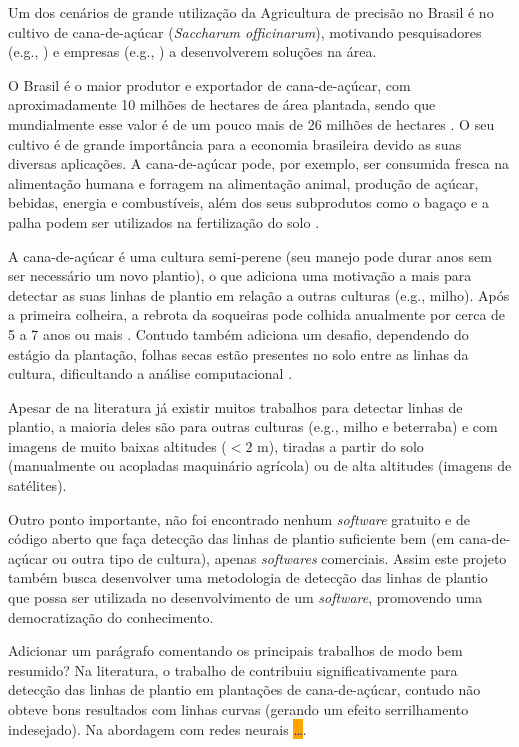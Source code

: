 \documentclass[12pt, a4paper, english, brazil]{article}
\newcommand{\textRed}[1]{{{\color{red} #1}}}
\newcommand{\dotsBlue}{\colorbox{orange}{\textcolor{blue}{\dots}}}
\begin{document}
Um dos cenários de grande utilização da Agricultura de precisão no Brasil é no cultivo de cana-de-açúcar (\textit{Saccharum officinarum}), motivando pesquisadores (e.g., ) e empresas (e.g., ) a desenvolverem soluções na área.

O Brasil é o maior produtor e exportador de cana-de-açúcar, com aproximadamente 10 milhões de hectares de área plantada, sendo que mundialmente esse valor é de um pouco mais de 26 milhões de hectares \cite{Ritchie_2020, IBGE_2021, FAOSTAT_2021}. O seu cultivo é de grande importância para a economia brasileira devido as suas diversas aplicações. A cana-de-açúcar pode, por exemplo, ser consumida fresca na alimentação humana e forragem na alimentação animal, produção de açúcar, bebidas, energia e combustíveis, além dos seus subprodutos como o bagaço e a palha podem ser utilizados na fertilização do solo \cite{Oliveira_2018}.

A cana-de-açúcar é uma cultura semi-perene (seu manejo pode durar anos sem ser necessário um novo plantio), o que adiciona uma motivação a mais para detectar as suas linhas de plantio em relação a outras culturas (e.g., milho). Após a primeira colheira, a rebrota da soqueiras pode colhida anualmente por cerca de 5 a 7 anos ou mais \cite{Rudorff_2010}. Contudo também adiciona um desafio, dependendo do estágio da plantação, folhas secas estão presentes no solo entre as linhas da cultura, dificultando a análise computacional \cite{Silva_2020}.

Apesar de na literatura já existir muitos trabalhos para detectar linhas de plantio, a maioria deles são para outras culturas (e.g., milho e beterraba) e com imagens de muito baixas altitudes ($< 2$ m), tiradas a partir do solo (manualmente ou acopladas maquinário agrícola) ou de alta altitudes (imagens de satélites).

Outro ponto importante, não foi encontrado nenhum \textit{software} gratuito e de código aberto que faça detecção das linhas de plantio suficiente bem (em cana-de-açúcar ou outra tipo de cultura), apenas \textit{softwares} comerciais. Assim este projeto também busca desenvolver uma metodologia de detecção das linhas de plantio que possa ser utilizada no desenvolvimento de um \textit{software}, promovendo uma democratização do conhecimento.

\textRed{Adicionar um parágrafo comentando os principais trabalhos de modo bem resumido?}
Na literatura, o trabalho de  contribuiu significativamente para detecção das linhas de plantio em plantações de cana-de-açúcar, contudo não obteve bons resultados com linhas curvas (gerando um efeito serrilhamento indesejado). \textRed{Na abordagem com redes neurais \dotsBlue}.
\end{document}
